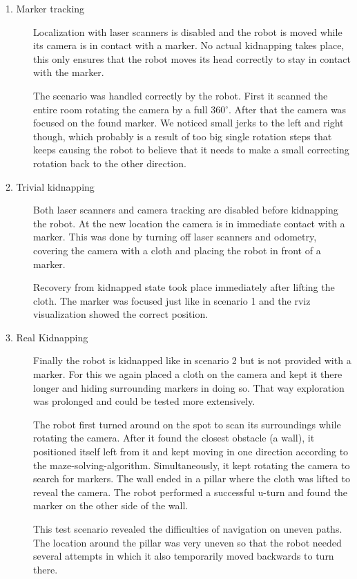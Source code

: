 \begin{description}
\item[1. Marker tracking] Localization with laser scanners is disabled and the robot is moved while its camera is in contact with a marker. No actual kidnapping takes place, this only ensures that the robot moves its head correctly to stay in contact with the marker.

The scenario was handled correctly by the robot. First it scanned the entire room rotating the camera by a full 360$^\circ$. After that the camera was focused on the found marker. We noticed small jerks to the left and right though, which probably is a result of too big single rotation steps that keeps causing the robot to believe that it needs to make a small correcting rotation back to the other direction.

\item[2. Trivial kidnapping] Both laser scanners and camera tracking are disabled before kidnapping the robot. At the new location the camera is in immediate contact with a marker. This was done by turning off laser scanners and odometry, covering the camera with a cloth and placing the robot in front of a marker.

Recovery from kidnapped state took place immediately after lifting the cloth. The marker was focused just like in scenario 1 and the rviz visualization showed the correct position.

\item[3. Real Kidnapping] Finally the robot is kidnapped like in scenario 2 but is not provided with a marker. For this we again placed a cloth on the camera and kept it there longer and hiding surrounding markers in doing so. That way exploration was prolonged and could be tested more extensively. 

The robot first turned around on the spot to scan its surroundings while rotating the camera. After it found the closest obstacle (a wall), it positioned itself left from it and kept moving in one direction according to the maze-solving-algorithm. Simultaneously, it kept rotating the camera to search for markers. The wall ended in a pillar where the cloth was lifted to reveal the camera. The robot performed a successful u-turn and found the marker on the other side of the wall.

This test scenario revealed the difficulties of navigation on uneven paths. The location around the pillar was very uneven so that the robot needed several attempts in which it also temporarily moved backwards to turn there.
\end{description}

